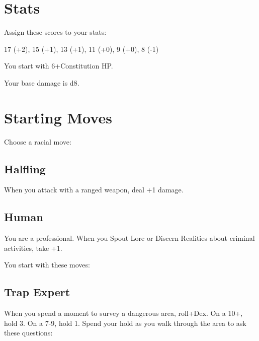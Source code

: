  
\section{Stats}   
 



Assign these scores to your stats:

 

17 (+2), 15 (+1), 13 (+1), 11 (+0), 9 (+0), 8 (-1)

 

You start with 6+Constitution HP.



 

Your base damage is d8.

 
\section{Starting Moves}   
 


\startInstructionsAfterHeader
Choose a racial move:
\stopInstructionsAfterHeader
 


\subsection{Halfling}  
 

When you attack with a ranged weapon, deal +1 damage.

 
\subsection{Human}   
 

You are a professional. When you Spout Lore or Discern Realities about criminal activities, take +1.



 


\startInstructions
You start with these moves:
\stopInstructions
 
\subsection{Trap Expert}    
 

When you spend a moment to survey a dangerous area, roll+Dex. On a 10+, hold 3. On a 7-9, hold 1. Spend your hold as you walk through the area to ask these questions:

